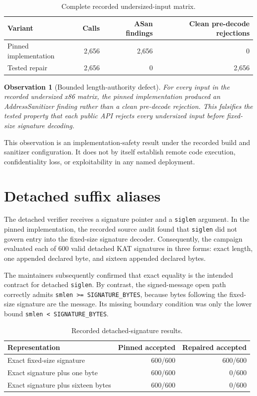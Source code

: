 \documentclass[11pt]{article}
\newtheorem{observation}{Observation}
\newcommand{\code}[1]{\texttt{#1}}
\begin{document}
\begin{table}[ht]
\centering
\caption{Complete recorded undersized-input matrix.}\label{tab:undersized}
\begin{tabular}{lrrr}
\toprule
Variant & Calls & ASan findings & Clean pre-decode rejections \\
\midrule
Pinned implementation & 2,656 & 2,656 & 0 \\
Tested repair          & 2,656 & 0     & 2,656 \\
\bottomrule
\end{tabular}
\end{table}

\begin{observation}[Bounded length-authority defect]
For every input in the recorded undersized x86 matrix, the pinned
implementation produced an AddressSanitizer finding rather than a clean
pre-decode rejection.  This falsifies the tested property that each public API
rejects every undersized input before fixed-size signature decoding.
\end{observation}

This observation is an implementation-safety result under the recorded build
and sanitizer configuration.  It does not by itself establish remote code
execution, confidentiality loss, or exploitability in any named deployment.

\section{Detached suffix aliases}

The detached verifier receives a signature pointer and a \code{siglen}
argument.  In the pinned implementation, the recorded source audit found that
\code{siglen} did not govern entry into the fixed-size signature decoder.
Consequently, the campaign evaluated each of 600 valid detached KAT
signatures in three forms: exact length, one appended declared byte, and
sixteen appended declared bytes.

The maintainers subsequently confirmed that exact equality is the intended
contract for detached \code{siglen}.  By contrast, the signed-message open path
correctly admits \code{smlen >= SIGNATURE\_BYTES}, because bytes following the
fixed-size signature are the message.  Its missing boundary condition was only
the lower bound \code{smlen < SIGNATURE\_BYTES}.

\begin{table}[ht]
\centering
\caption{Recorded detached-signature results.}\label{tab:trailing}
\begin{tabular}{lrr}
\toprule
Representation & Pinned accepted & Repaired accepted \\
\midrule
Exact fixed-size signature       & 600/600   & 600/600 \\
Exact signature plus one byte    & 600/600   & 0/600 \\
Exact signature plus sixteen bytes & 600/600 & 0/600 \\
\bottomrule
\end{tabular}
\end{table}
\end{document}
